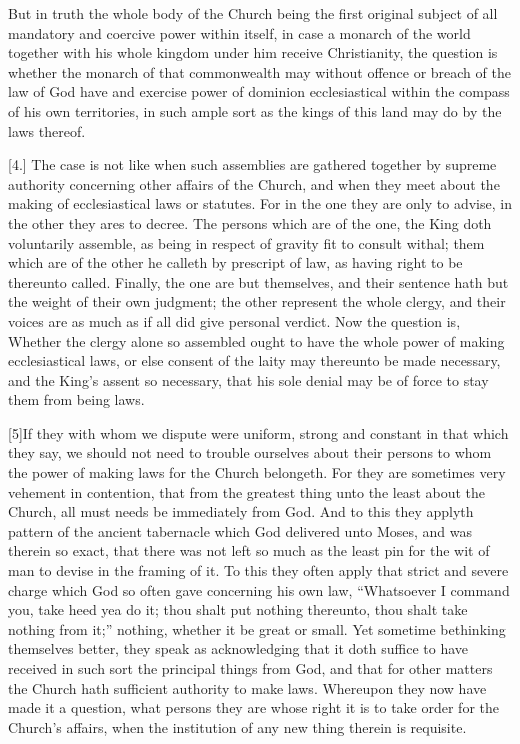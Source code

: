 But in truth the whole body of the Church being the first original subject of all mandatory and coercive power within itself, in case a monarch of the world together with his whole kingdom under him receive Christianity, the question is whether the monarch of that commonwealth may without offence or breach of the law of God have and exercise power of dominion ecclesiastical within the compass of his own territories, in such ample sort as the kings of this land may do by the laws thereof.


[4.] The case is not like when such assemblies are  gathered together by supreme authority concerning other affairs of the Church, and when they meet about the making of ecclesiastical laws or statutes. For in the one they are only to advise, in the other they ares to decree. The persons which are of the one, the King doth voluntarily assemble, as being in respect of gravity fit to consult withal; them which are of the other he calleth by prescript of law, as having right to be thereunto called. Finally, the one are but themselves, and their sentence hath but the weight of their own judgment; the other represent the whole clergy, and their voices are as much as if all did give personal verdict. Now the question is, Whether the clergy alone so assembled ought to have the whole power of making ecclesiastical laws, or else consent of the laity may thereunto be made necessary, and the King’s assent so necessary, that his sole denial may be of force to stay them from being laws.

[5]If they with whom we dispute were uniform, strong and constant in that which they say, we should not need to trouble ourselves about their persons to whom the power of making laws for the Church belongeth. For they are sometimes very vehement in contention, that from the greatest thing unto the least about the Church, all must needs be immediately from God. And to this they applyth pattern of the ancient tabernacle which God delivered unto Moses, and was therein so exact, that there was not left so much as the least pin for the wit of man to devise in the framing of it.  To this they often apply that strict and severe charge which God so often gave concerning his own law, “Whatsoever I command you, take heed yea do it; thou shalt put nothing thereunto, thou shalt take nothing from it;” nothing, whether it be great or small. Yet sometime bethinking themselves better, they speak as acknowledging that it doth suffice to have received in such sort the principal things from God, and that for other matters the Church hath sufficient authority to make laws. Whereupon they now have made it a question, what persons they are whose right it is to take order for the Church’s affairs, when the institution of any new thing therein is requisite.

